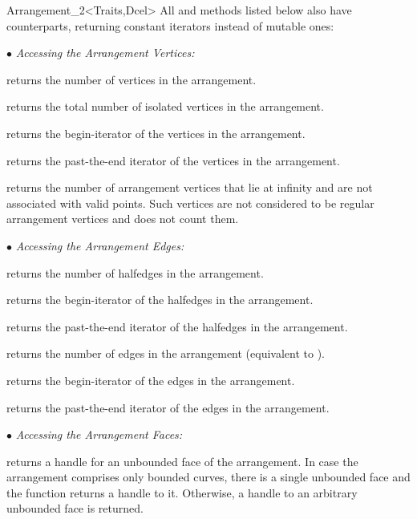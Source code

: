 \begin{ccRefClass}{Arrangement_2<Traits,Dcel>}
All  and  methods listed below also have 
counterparts, returning constant iterators instead of mutable ones:

$\bullet$ {\sl Accessing the Arrangement Vertices:}

    {returns the number of vertices in the arrangement.}

    {returns the total number of isolated vertices in the arrangement.}

    {returns the begin-iterator of the vertices in the arrangement.}
    
    {returns the past-the-end iterator of the vertices in the arrangement.}

    {returns the number of arrangement vertices that lie at infinity and
     are not associated with valid points. Such vertices are not considered
     to be regular arrangement vertices and \ccVar{}
     does not count them.}

$\bullet$ {\sl Accessing the Arrangement Edges:}

    {returns the number of halfedges in the arrangement.}

    {returns the begin-iterator of the halfedges in the arrangement.}
 
    {returns the past-the-end iterator of the halfedges in the arrangement.}

    {returns the number of edges in the arrangement (equivalent to
     ).}

    {returns the begin-iterator of the edges in the arrangement.}
 
    {returns the past-the-end iterator of the edges in the arrangement.}

$\bullet$ {\sl Accessing the Arrangement Faces:}

    {returns a handle for an unbounded face of the arrangement.
     In case the arrangement comprises only bounded curves, there is a single
     unbounded face and the function returns a handle to it. Otherwise, a
     handle to an arbitrary unbounded face is returned.}


\end{ccRefClass}
